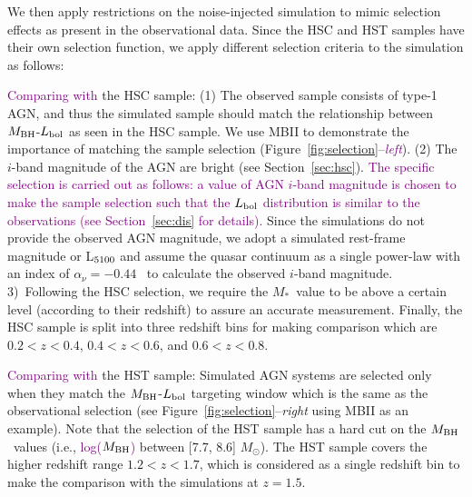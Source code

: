 \documentclass[twocolumn]{aastex631}
\newcommand{\todo}[1]{\textcolor{red}{[{\bf TODO}: #1]}}
\newcommand{\red}[1]{\textcolor{purple}{#1}}
\def\smass{{$M_*$}}
\def\mbh{$M_{\rm BH}$}
\begin{document}
We then apply restrictions on the noise-injected simulation to mimic selection effects as present in the observational data. Since the HSC and HST samples have their own selection function, we apply different selection criteria to the simulation as follows:

\red{Comparing with} the HSC sample: (1) The observed sample consists of type-1 AGN, and thus the simulated sample should match the relationship between \mbh-$L_{\rm bol}$ as seen in the HSC sample. We use MBII to demonstrate the importance of matching the sample selection (Figure~\ref{fig:selection}--{\it \red{left}}). (2) The $i$-band magnitude of the AGN are bright (see Section~\ref{sec:hsc}). 
\red{The specific selection is carried out as follows: a value of AGN $i$-band magnitude is chosen to make the sample selection such that the $L_{\rm bol}$ distribution is similar to the observations (see Section~\ref{sec:dis} for details). }
Since the simulations do not provide the observed AGN magnitude, we adopt a simulated rest-frame magnitude or L$_{\rm 5100}$ and assume the quasar continuum as a single power-law with an index of $\alpha_\nu=-0.44$~\citep{2001AJ....122..549V} to calculate the observed $i$-band magnitude.
 3)~Following the HSC selection, we require the \smass\ value to be above a certain level (according to their redshift) to assure an accurate measurement. Finally, the HSC sample is split into three redshift bins for making comparison which are $0.2<z<0.4$, $0.4<z<0.6$, and $0.6<z<0.8$.
 
\red{Comparing with} the HST sample: Simulated AGN systems are selected only when they match the  \mbh-$L_{\rm bol}$ targeting window which is the same as the observational selection (see Figure~\ref{fig:selection}--{\it right} using MBII as an example). Note that the selection of the HST sample has a hard cut on the \mbh\ values (i.e., \red{log(\mbh)} between [7.7, 8.6] $M_{\odot}$). The HST sample covers the higher redshift range $1.2<z<1.7$, which is considered as a single redshift bin to make the comparison with the simulations at $z=1.5$.

\end{document}
